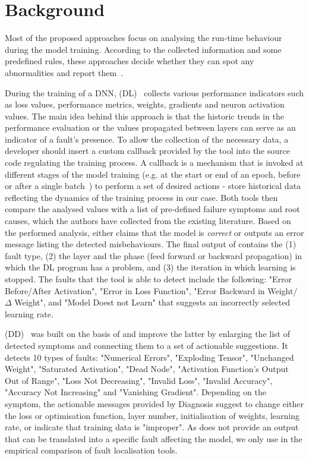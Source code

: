 \section{Background}
\label{sec:background}

 Most of the proposed approaches focus
on analysing the run-time behaviour during the model training. According to the
collected information and some predefined rules, these approaches decide whether
they can spot any abnormalities and report them~\cite{deeplocalize,
wardat2022deepdiagnosis, schoop2021umlaut}.

During the training of a DNN, \DL (DL)~\cite{deeplocalize} collects various performance indicators such as loss values, performance metrics, weights,
gradients and neuron activation values. The main idea behind this approach is that the historic trends in the performance evaluation or the values propagated between layers can serve as an indicator of a fault's presence. To allow the collection of the necessary data, a developer should insert a custom callback provided by the tool into the source code regulating the training process. A callback is a mechanism that is invoked at different stages of the model training (e.g. at the start or end of an epoch, before or after a single batch~\cite{keras}) to perform a set of desired actions - store historical data reflecting the dynamics of the training process in our case. Both tools then compare the analysed values with a list of pre-defined failure symptoms and root causes, which the authors have collected from the existing literature. Based on the performed analysis, \DL either claims that the model is \textit{correct} or outputs an error message listing the detected misbehaviours. The final output of \DL contains the (1) fault type, (2) the layer and the phase (feed forward or backward propagation) in which the DL program has a problem, and (3) the iteration in which  learning is stopped. The faults that the tool is able to detect include the following: "Error Before/After Activation", "Error in Loss Function", "Error Backward in Weight/$\Delta$ Weight", and "Model Doest not Learn" that suggests an incorrectly selected learning rate.

\DD (DD)~\cite{wardat2022deepdiagnosis} was built on the basis of \DL and improve the latter by enlarging the list of detected symptoms and connecting them to a set of actionable suggestions. It detects 10 types of faults: "Numerical Errors", "Exploding Tensor", "Unchanged Weight", "Saturated Activation", "Dead Node", "Activation Function's Output Out of Range", "Loss Not Decreasing", "Invalid Loss", "Invalid Accuracy", "Accuracy Not Increasing" and "Vanishing Gradient". Depending on the symptom, the actionable messages provided by Diagnosis suggest to change either the loss or optimisation function, layer number, initialisation of weights, learning rate, or indicate that training data is "improper". As \DL does not provide an output that can be translated into a specific fault affecting the model, we only use \DD in the empirical comparison of fault localisation tools.

